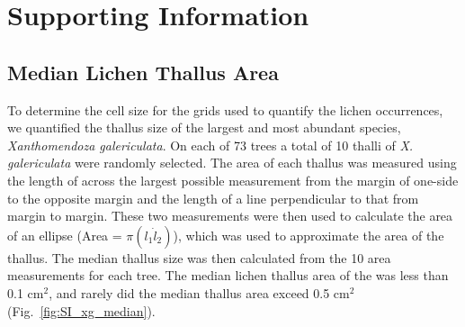 \documentclass[11pt,onecolumn,lineno]{olplainarticle}
\begin{document}
\section*{Supporting Information}



\setcounter{figure}{0}
\setcounter{table}{0}

\subsection*{Median Lichen Thallus Area}

To determine the cell size for the grids used to quantify the lichen
occurrences, we quantified the thallus size of the largest and most
abundant species, \textit{Xanthomendoza galericulata}. On each of 73
trees a total of 10 thalli of \textit{X. galericulata} were randomly
selected. The area of each thallus was measured using the length of
across the largest possible measurement from the margin of one-side to
the opposite margin and the length of a line perpendicular to that
from margin to margin. These two measurements were then used to
calculate the area of an ellipse (Area = $\pi (l_1 \dot l_2)$), which
was used to approximate the area of the thallus. The median thallus
size was then calculated from the 10 area measurements for each
tree. The median lichen thallus area of the was less than 0.1 cm$^2$,
and rarely did the median thallus area exceed 0.5 cm$^2$
(Fig.~\ref{fig:SI_xg_median}).
\end{document}
